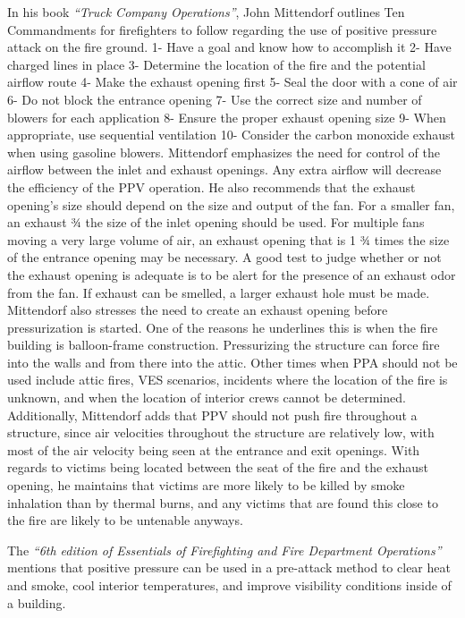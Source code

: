 \documentclass{article}
\begin{document}
In his book \textit{``Truck Company Operations''}, John Mittendorf outlines Ten Commandments for firefighters to follow regarding the use of positive pressure attack on the fire ground. 1- Have a goal and know how to accomplish it 2- Have charged lines in place 3- Determine the location of the fire and the potential airflow route 4- Make the exhaust opening first 5- Seal the door with a cone of air 6- Do not block the entrance opening 7- Use the correct size and number of blowers for each application 8- Ensure the proper exhaust opening size 9- When appropriate, use sequential ventilation 10- Consider the carbon monoxide exhaust when using gasoline blowers. Mittendorf emphasizes the need for control of the airflow between the inlet and exhaust openings. Any extra airflow will decrease the efficiency of the PPV operation. He also recommends that the exhaust opening’s size should depend on the size and output of the fan. For a smaller fan, an exhaust ¾ the size of the inlet opening should be used. For multiple fans moving a very large volume of air, an exhaust opening that is 1 ¾ times the size of the entrance opening may be necessary. A good test to judge whether or not the exhaust opening is adequate is to be alert for the presence of an exhaust odor from the fan. If exhaust can be smelled, a larger exhaust hole must be made. Mittendorf also stresses the need to create an exhaust opening before pressurization is started. One of the reasons he underlines this is when the fire building is balloon-frame construction. Pressurizing the structure can force fire into the walls and from there into the attic. Other times when PPA should not be used include attic fires, VES scenarios, incidents where the location of the fire is unknown, and when the location of interior crews cannot be determined. Additionally, Mittendorf adds that PPV should not push fire throughout a structure, since air velocities throughout the structure are relatively low, with most of the air velocity being seen at the entrance and exit openings. With regards to victims being located between the seat of the fire and the exhaust opening, he maintains that victims are more likely to be killed by smoke inhalation than by thermal burns, and any victims that are found this close to the fire are likely to be untenable anyways.\cite{TruckCoOps}

The \textit{``6th edition of Essentials of Firefighting and Fire Department Operations''} mentions that positive pressure can be used in a pre-attack method to clear heat and smoke, cool interior temperatures, and improve visibility conditions inside of a building.\cite{IFSTAESS}
\end{document}
